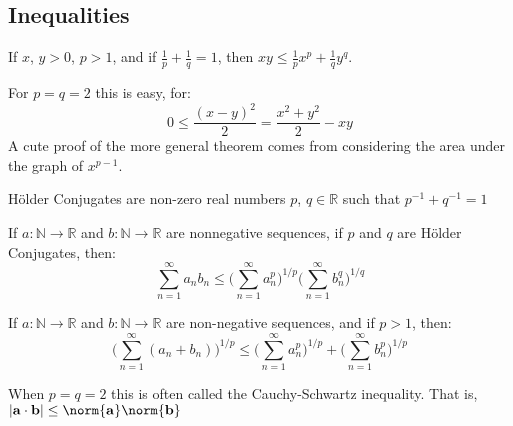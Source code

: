 \documentclass[crop=false,class=book,oneside]{standalone}
\begin{document}
        \subsection{Inequalities}
            \begin{theorem}
                If $x$, $y>0$, $p>1$, and if
                $\frac{1}{p}+\frac{1}{q}=1$, then
                $xy\leq{\frac{1}{p}x^{p}+\frac{1}{q}y^{q}}$.
            \end{theorem}
            For $p=q=2$ this is easy, for:
            \begin{equation*}
                0\leq\frac{(x-y)^{2}}{2}=
                \frac{x^{2}+y^{2}}{2}-xy
            \end{equation*}
            A cute proof of the more general theorem comes from
            considering the area under the graph of
            $x^{p-1}$.
            \begin{definition}
                H\"{o}lder Conjugates are non-zero real numbers
                $p$, $q\in\mathbb{R}$ such that
                $p^{-1}+q^{-1}=1$
            \end{definition}
            \begin{theorem}
                If $a:\mathbb{N}\rightarrow\mathbb{R}$ and
                $b:\mathbb{N}\rightarrow\mathbb{R}$
                are nonnegative
                sequences, if $p$ and $q$ are
                H\"{o}lder Conjugates, then:
                \begin{equation*}
                    \sum_{n=1}^{\infty}a_{n}b_{n}
                    \leq
                    \bigg(
                        \sum_{n=1}^{\infty}a_{n}^{p}
                    \bigg)^{1/p}
                    \bigg(
                        \sum_{n=1}^{\infty}b_{n}^{q}
                    \bigg)^{1/q}
                \end{equation*}
            \end{theorem}
            \begin{theorem}
                If $a:\mathbb{N}\rightarrow\mathbb{R}$
                and $b:\mathbb{N}\rightarrow\mathbb{R}$ are
                non-negative sequences, and if $p>1$,
                then:
                \begin{equation*}
                    \bigg(
                        \sum_{n=1}^{\infty}(a_{n}+b_{n})
                    \bigg)^{1/p}
                    \leq
                    \bigg(
                        \sum_{n=1}^{\infty}a_{n}^{p}
                    \bigg)^{1/p}
                    +
                    \bigg(
                        \sum_{n=1}^{\infty}b_{n}^{p}
                    \bigg)^{1/p}
                \end{equation*}
            \end{theorem}
            When $p=q=2$ this is often
            called the Cauchy-Schwartz inequality.
            That is,
            $|\mathbf{a}\cdot\mathbf{b}|%
             \leq\norm{\mathbf{a}}\norm{\mathbf{b}}$
\end{document}
